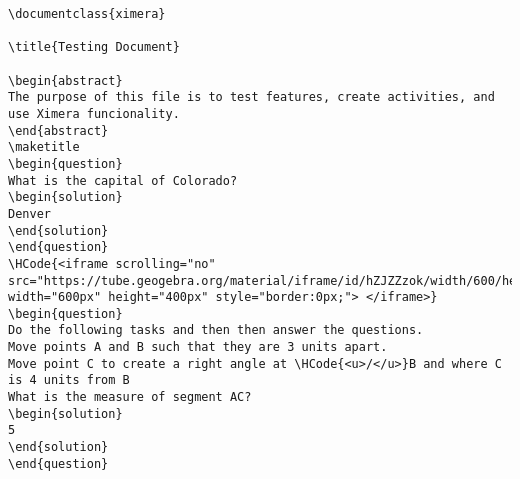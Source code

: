 \begin{Verbatim}
\documentclass{ximera}

\title{Testing Document}

\begin{abstract}
The purpose of this file is to test features, create activities, and use Ximera funcionality.
\end{abstract}
\maketitle
\begin{question}
What is the capital of Colorado?
\begin{solution}
Denver
\end{solution}
\end{question}
\HCode{<iframe scrolling="no" src="https://tube.geogebra.org/material/iframe/id/hZJZZzok/width/600/height/400/border/888888/rc/false/ai/false/sdz/true/smb/false/stb/false/stbh/true/ld/false/sri/true/at/auto" width="600px" height="400px" style="border:0px;"> </iframe>}
\begin{question}
Do the following tasks and then then answer the questions.
Move points A and B such that they are 3 units apart.
Move point C to create a right angle at \HCode{<u>/</u>}B and where C is 4 units from B
What is the measure of segment AC?
\begin{solution}
5
\end{solution}
\end{question}

\end{Verbatim}
